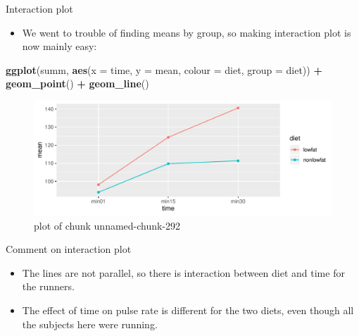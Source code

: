 \documentclass[ignorenonframetext,]{beamer}
\newenvironment{Shaded}{\begin{snugshade}}{\end{snugshade}}
\newcommand{\DataTypeTok}[1]{\textcolor[rgb]{0.13,0.29,0.53}{#1}}
\newcommand{\KeywordTok}[1]{\textcolor[rgb]{0.13,0.29,0.53}{\textbf{#1}}}
\newcommand{\NormalTok}[1]{#1}
\newcommand{\OperatorTok}[1]{\textcolor[rgb]{0.81,0.36,0.00}{\textbf{#1}}}
\newcommand{\StringTok}[1]{\textcolor[rgb]{0.31,0.60,0.02}{#1}}
\providecommand{\tightlist}{%
  \setlength{\itemsep}{0pt}\setlength{\parskip}{0pt}}
\begin{document}
\begin{frame}[fragile]{Interaction plot}
\protect\hypertarget{interaction-plot-4}{}

\begin{itemize}
\tightlist
\item
  We went to trouble of finding means by group, so making interaction
  plot is now mainly easy:
\end{itemize}

\begin{Shaded}
\begin{Highlighting}[]
\KeywordTok{ggplot}\NormalTok{(summ, }\KeywordTok{aes}\NormalTok{(}\DataTypeTok{x =}\NormalTok{ time, }\DataTypeTok{y =}\NormalTok{ mean, }\DataTypeTok{colour =}\NormalTok{ diet,}
                 \DataTypeTok{group =}\NormalTok{ diet)) }\OperatorTok{+}\StringTok{ }\KeywordTok{geom_point}\NormalTok{() }\OperatorTok{+}\StringTok{ }\KeywordTok{geom_line}\NormalTok{()}
\end{Highlighting}
\end{Shaded}

\begin{figure}
\centering
\includegraphics{figure/unnamed-chunk-292-1.pdf}
\caption{plot of chunk unnamed-chunk-292}
\end{figure}

\end{frame}

\begin{frame}{Comment on interaction plot}
\protect\hypertarget{comment-on-interaction-plot}{}

\begin{itemize}
\tightlist
\item
  The lines are not parallel, so there is interaction between diet and
  time for the runners.
\item
  The effect of time on pulse rate is different for the two diets, even
  though all the subjects here were running.
\end{itemize}

\end{frame}
\end{document}
